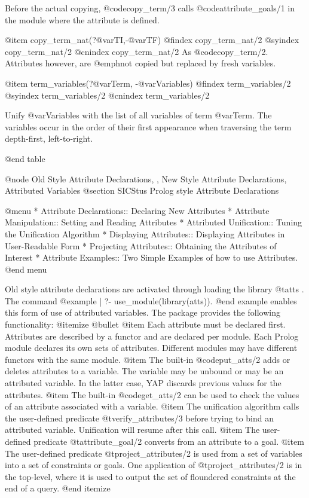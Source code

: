 {{{{{{{{{Before the actual copying, @code{copy_term/3} calls
@code{attribute_goals/1} in the module where the attribute is
defined.

@item copy_term_nat(?@var{TI},-@var{TF}) 
@findex copy_term_nat/2
@syindex copy_term_nat/2
@cnindex copy_term_nat/2
As @code{copy_term/2}.  Attributes however, are @emph{not} copied but replaced
by fresh variables.

@item term_variables(?@var{Term}, -@var{Variables})
@findex  term_variables/2
@syindex term_variables/2
@cnindex term_variables/2

Unify @var{Variables} with the list of all variables of term
@var{Term}.  The variables occur in the order of their first
appearance when traversing the term depth-first, left-to-right.

@end table

@node Old Style Attribute Declarations, , New Style Attribute Declarations, Attributed Variables
@section SICStus Prolog style Attribute Declarations

@menu
* Attribute Declarations:: Declaring New Attributes
* Attribute Manipulation:: Setting and Reading Attributes
* Attributed Unification:: Tuning the Unification Algorithm
* Displaying Attributes:: Displaying Attributes in User-Readable Form
* Projecting Attributes:: Obtaining the Attributes of Interest
* Attribute Examples:: Two Simple Examples of how to use Attributes.
@end menu

Old style attribute declarations are activated through loading the library @t{atts} . The command
@example
| ?- use_module(library(atts)).
@end example
enables this form of use of attributed variables. The package provides the
following functionality:
@itemize @bullet
@item Each attribute must be declared first. Attributes are described by a functor
and are declared per module. Each Prolog module declares its own sets of
attributes. Different modules may have different functors with the same
module.
@item The built-in @code{put_atts/2} adds or deletes attributes to a
variable. The variable may be unbound or may be an attributed
variable. In the latter case, YAP discards previous values for the
attributes.
@item The built-in @code{get_atts/2} can be used to check the values of
an attribute associated with a variable.
@item The unification algorithm calls the user-defined predicate
@t{verify_attributes/3} before trying to bind an attributed
variable. Unification will resume after this call.
@item The user-defined predicate
@t{attribute_goal/2} converts from an attribute to a goal.
@item The user-defined predicate
@t{project_attributes/2} is used from a set of variables into a set of
constraints or goals. One application of @t{project_attributes/2} is in
the top-level, where it is used to output the set of
floundered constraints at the end of a query.
@end itemize

}}}}}}}}}
